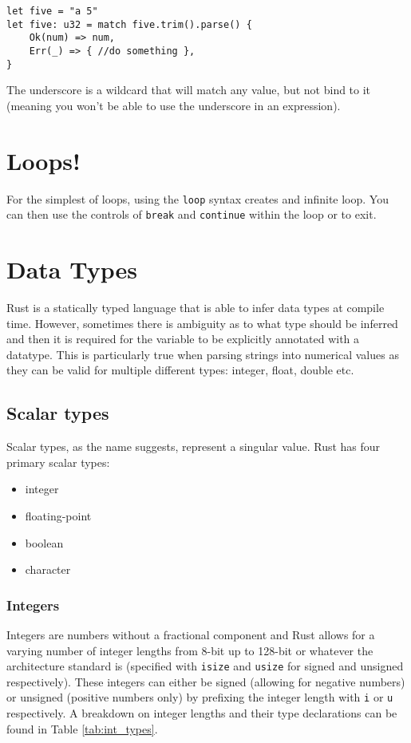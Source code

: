 \documentclass[12pt,notitlepage]{article}
\begin{document}
\begin{lstlisting}
let five = "a 5"
let five: u32 = match five.trim().parse() {
    Ok(num) => num,
    Err(_) => { //do something },
}
\end{lstlisting}

The underscore is a wildcard that will match any value, but not bind to it
(meaning you won't be able to use the underscore in an expression).


\section{Loops!}

For the simplest of loops, using the \lstinline{loop} syntax creates and
infinite loop. You can then use the controls of \lstinline{break} and
\lstinline{continue} within the loop or to exit.


\section{Data Types}

Rust is a statically typed language that is able to infer data types at compile
time. However, sometimes there is ambiguity as to what type should be inferred
and then it is required for the variable to be explicitly annotated with a
datatype. This is particularly true when parsing strings into numerical values
as they can be valid for multiple different types: integer, float, double etc. 

\subsection{Scalar types}

Scalar types, as the name suggests, represent a singular value. Rust has four
primary scalar types:

\begin{itemize}
    \item integer
    \item floating-point
    \item boolean
    \item character
\end{itemize}

\subsubsection{Integers}

Integers are numbers without a fractional component and Rust allows for a
varying number of integer lengths from 8-bit up to 128-bit or whatever the
architecture standard is (specified with \lstinline{isize} and
\lstinline{usize} for signed and unsigned respectively). These integers can
either be signed (allowing for negative numbers) or unsigned (positive numbers
only) by prefixing the integer length with \lstinline{i} or
\lstinline{u} respectively. A breakdown on integer lengths and their type
declarations can be found in Table \ref{tab:int_types}.
\end{document}
